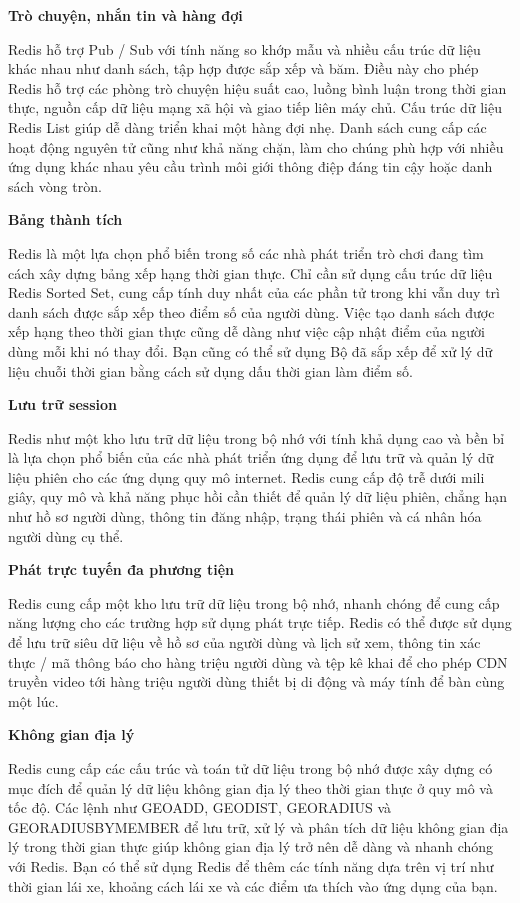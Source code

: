 \textbf{Trò chuyện, nhắn tin và hàng đợi}

Redis hỗ trợ Pub / Sub với tính năng so khớp mẫu và nhiều cấu trúc dữ liệu khác nhau như danh sách, tập hợp được sắp xếp và băm. Điều này cho phép Redis hỗ trợ các phòng trò chuyện hiệu suất cao, luồng bình luận trong thời gian thực, nguồn cấp dữ liệu mạng xã hội và giao tiếp liên máy chủ. Cấu trúc dữ liệu Redis List giúp dễ dàng triển khai một hàng đợi nhẹ. Danh sách cung cấp các hoạt động nguyên tử cũng như khả năng chặn, làm cho chúng phù hợp với nhiều ứng dụng khác nhau yêu cầu trình môi giới thông điệp đáng tin cậy hoặc danh sách vòng tròn.

\textbf{Bảng thành tích}

Redis là một lựa chọn phổ biến trong số các nhà phát triển trò chơi đang tìm cách xây dựng bảng xếp hạng thời gian thực. Chỉ cần sử dụng cấu trúc dữ liệu Redis Sorted Set, cung cấp tính duy nhất của các phần tử trong khi vẫn duy trì danh sách được sắp xếp theo điểm số của người dùng. Việc tạo danh sách được xếp hạng theo thời gian thực cũng dễ dàng như việc cập nhật điểm của người dùng mỗi khi nó thay đổi. Bạn cũng có thể sử dụng Bộ đã sắp xếp để xử lý dữ liệu chuỗi thời gian bằng cách sử dụng dấu thời gian làm điểm số.

\textbf{Lưu trữ session}

Redis như một kho lưu trữ dữ liệu trong bộ nhớ với tính khả dụng cao và bền bỉ là lựa chọn phổ biến của các nhà phát triển ứng dụng để lưu trữ và quản lý dữ liệu phiên cho các ứng dụng quy mô internet. Redis cung cấp độ trễ dưới mili giây, quy mô và khả năng phục hồi cần thiết để quản lý dữ liệu phiên, chẳng hạn như hồ sơ người dùng, thông tin đăng nhập, trạng thái phiên và cá nhân hóa người dùng cụ thể.

\textbf{Phát trực tuyến đa phương tiện}

Redis cung cấp một kho lưu trữ dữ liệu trong bộ nhớ, nhanh chóng để cung cấp năng lượng cho các trường hợp sử dụng phát trực tiếp. Redis có thể được sử dụng để lưu trữ siêu dữ liệu về hồ sơ của người dùng và lịch sử xem, thông tin xác thực / mã thông báo cho hàng triệu người dùng và tệp kê khai để cho phép CDN truyền video tới hàng triệu người dùng thiết bị di động và máy tính để bàn cùng một lúc.

\textbf{Không gian địa lý}

Redis cung cấp các cấu trúc và toán tử dữ liệu trong bộ nhớ được xây dựng có mục đích để quản lý dữ liệu không gian địa lý theo thời gian thực ở quy mô và tốc độ. Các lệnh như GEOADD, GEODIST, GEORADIUS và GEORADIUSBYMEMBER để lưu trữ, xử lý và phân tích dữ liệu không gian địa lý trong thời gian thực giúp không gian địa lý trở nên dễ dàng và nhanh chóng với Redis. Bạn có thể sử dụng Redis để thêm các tính năng dựa trên vị trí như thời gian lái xe, khoảng cách lái xe và các điểm ưa thích vào ứng dụng của bạn.

